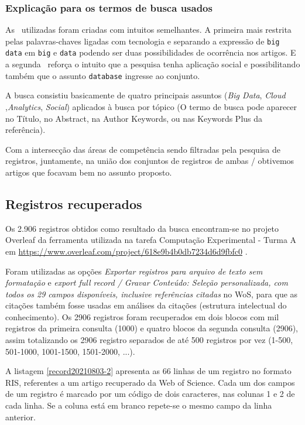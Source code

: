 \subsubsection{Explicação para os termos de busca usados\label{MASSA:query}}

As \querys\ utilizadas foram criadas com intuitos semelhantes. A primeira mais restrita pelas palavras-chaves ligadas com tecnologia e separando a expressão de \texttt{big data} em \texttt{big} e \texttt{data} podendo ser duas possibilidades de ocorrência nos artigos. E a segunda \query\ reforça o intuito que a pesquisa tenha aplicação social e possibilitando também que o assunto  \texttt{database} ingresse ao conjunto.

A busca consistiu basicamente de quatro principais assuntos (\textit{Big Data}, \textit{Cloud} ,\textit{Analytics}, \textit{Social}) aplicados à busca por tópico (O termo de busca pode aparecer no Título, no Abstract, na Author Keywords, ou nas Keywords Plus da referência).

Com a intersecção das áreas de competência sendo filtradas pela pesquisa de registros, juntamente, na união dos conjuntos de registros de ambas \querys/ obtivemos artigos que focavam bem no assunto proposto.

\subsection{Registros recuperados}

Os 2.906 registros obtidos como resultado da busca encontram-se no projeto Overleaf da ferramenta utilizada na tarefa Computação Experimental - Turma A em \url{https://www.overleaf.com/project/618e9b4b0db7234d6d9fbfc0} . 

Foram utilizadas as opções \textit{Exportar registros para arquivo de texto sem formatação} e \textit{export full record / Gravar Conteúdo: Seleção personalizada, com todos os 29 campos disponíveis, inclusive referências citadas} no WoS, para que as citações também fosse usadas em análises da citações (estrutura intelectual do conhecimento). Os 2906 registros foram recuperados em dois blocos com mil registros da primeira consulta (1000) e quatro blocos da segunda consulta (2906), assim totalizando os 2906 registro  separados de até 500 registros por vez (1-500, 501-1000, 1001-1500, 1501-2000, ...).

A listagem \ref{record20210803-2} apresenta as 66 linhas de um registro no formato RIS, referentes a um artigo recuperado da Web of Science. Cada um dos campos de um registro é marcado por um código de dois caracteres, nas colunas 1 e 2 de cada linha. Se a coluna está em branco repete-se o mesmo campo da linha anterior.

